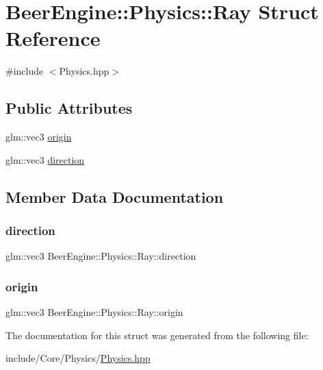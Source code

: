 \hypertarget{struct_beer_engine_1_1_physics_1_1_ray}{}\section{Beer\+Engine\+:\+:Physics\+:\+:Ray Struct Reference}
\label{struct_beer_engine_1_1_physics_1_1_ray}


{\ttfamily \#include $<$Physics.\+hpp$>$}

\subsection*{Public Attributes}
\begin{DoxyCompactItemize}
\item 
glm\+::vec3 \mbox{\hyperlink{struct_beer_engine_1_1_physics_1_1_ray_a50d88f408e39fb77275d23074ef4c99f}{origin}}
\item 
glm\+::vec3 \mbox{\hyperlink{struct_beer_engine_1_1_physics_1_1_ray_ad70d648a97475b6109d09d6c710fac4b}{direction}}
\end{DoxyCompactItemize}


\subsection{Member Data Documentation}
\mbox{\label{struct_beer_engine_1_1_physics_1_1_ray_ad70d648a97475b6109d09d6c710fac4b}} 
\subsubsection{\texorpdfstring{direction}{direction}}
{\footnotesize\ttfamily glm\+::vec3 Beer\+Engine\+::\+Physics\+::\+Ray\+::direction}

\mbox{\label{struct_beer_engine_1_1_physics_1_1_ray_a50d88f408e39fb77275d23074ef4c99f}} 
\subsubsection{\texorpdfstring{origin}{origin}}
{\footnotesize\ttfamily glm\+::vec3 Beer\+Engine\+::\+Physics\+::\+Ray\+::origin}



The documentation for this struct was generated from the following file\+:\begin{DoxyCompactItemize}
\item 
include/\+Core/\+Physics/\mbox{\hyperlink{_physics_8hpp}{Physics.\+hpp}}\end{DoxyCompactItemize}
